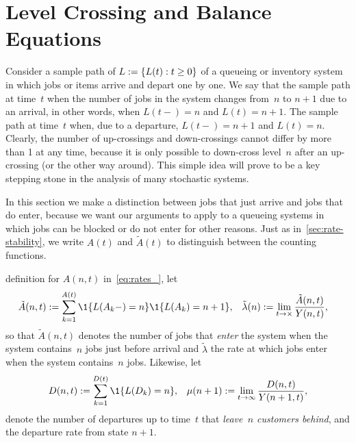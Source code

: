 \documentclass[stochastic-or.tex]{subfiles}
\begin{document}
\section{Level Crossing and Balance Equations}
\label{sec:level-cross-balance}

Consider a sample path of $L:=\{L(t) : t\geq 0\}$ of a queueing or inventory system in which jobs or items arrive and depart one by one.
We say that the sample path  at time~$t$ when the number of jobs in the system changes from~$n$ to $n+1$ due to an arrival, in other words, when $L(t-)=n$ and $L(t)=n+1$.
The sample path  at time~$t$ when, due to a departure, $L(t-)=n+1$ and $L(t)=n$.
Clearly, the number of up-crossings and down-crossings cannot differ by more than 1 at any time, because it is only possible to down-cross level~$n$ after an up-crossing (or the other way around).
This simple idea will prove to be a key stepping stone in the analysis of many stochastic systems.

In this section we make a distinction between jobs that just arrive and jobs that do enter, because we want our arguments to apply to a queueing systems in which jobs can be blocked or do not enter for other reasons.
Just as in~\cref{sec:rate-stability}, we write $A(t)$ and $\tilde A(t)$ to distinguish between the counting functions.


 definition for $A(n,t)$ in~\cref{eq:rates_}, let
\begin{align}\label{eq:102}
 \tilde A(n,t) &:=  \sum_{k=1}^{A(t)} \1{L(A_k-) = n}\1{\L(A_k) = n+1}, &
\tilde \lambda(n) &:= \lim_{t\to\times} \frac{\tilde A(n,t)}{Y(n,t)},
 \end{align}
 so that $\tilde A(n,t)$ denotes the number of jobs that \emph{enter} the system when the system contains~$n$ jobs just before arrival and
$\tilde \lambda$  the rate at which jobs enter when the system contains~$n$ jobs.
Likewise, let
\begin{align}
 D(n,t) &:=  \sum_{k=1}^{D(t)} \1{\L(D_k) = n}, & \mu(n+1) := \lim_{t\to\infty} \frac{D(n,t)}{Y(n+1,t)},
 \end{align}
denote the number of departures up to time~$t$ that\emph{ leave~$n$ customers behind}, and the departure rate from state $n+1$.
\end{document}
